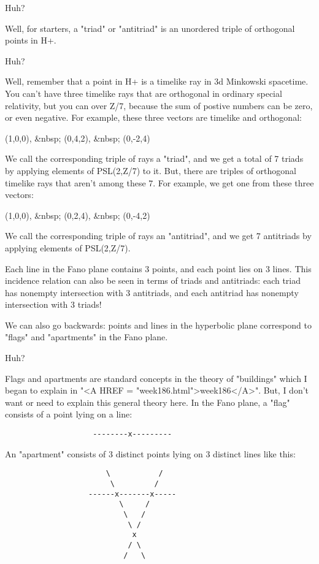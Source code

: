 Huh?  

Well, for starters, a "triad" or "antitriad" is an unordered triple of orthogonal 
points in H+.   

Huh?  

Well, remember that a point in H+ is a timelike ray in 3d Minkowski spacetime.
You can't have three timelike rays that are orthogonal in ordinary special 
relativity, but you can over Z/7, because the sum of postive numbers can be zero, 
or even negative.  For example, these three vectors are timelike and orthogonal:

(1,0,0), &nbsp; (0,4,2),  &nbsp; (0,-2,4)

We call the corresponding triple of rays a 
"triad", and we get a total of 7 triads 
by applying elements of PSL(2,Z/7) to it.  But, there are triples of orthogonal 
timelike rays that aren't among these 7.  For example, we get one from these three 
vectors:

(1,0,0),  &nbsp; (0,2,4), &nbsp; (0,-4,2)

We call the corresponding triple of rays an "antitriad", 
and we get 7  
antitriads by applying elements of PSL(2,Z/7).

Each line in the Fano plane contains 3 points, and each point lies on 3
lines.  This incidence relation can also be seen in terms of triads and
antitriads: each triad has nonempty intersection with 3 antitriads, and
each antitriad has nonempty intersection with 3 triads!

We can also go backwards: points and lines in the hyperbolic plane correspond
to "flags" and "apartments" in the Fano plane.  

Huh?

Flags and apartments are standard concepts in the 
theory of "buildings"
which I began to explain in "<A HREF = "week186.html">week186</A>".  
But, I don't want or need to explain
this general theory here.  In the Fano plane, a "flag" 
consists of a point
lying on a line:
\begin{verbatim}
                    --------x---------
\end{verbatim}
    
An "apartment" 
consists of 3 distinct points lying on 3 distinct lines like
this:
\begin{verbatim}
                       \           /
                        \         /
                   ------x-------x-----
                          \     /
                           \   /
                            \ /
                             x
                            / \
                           /   \
\end{verbatim}
    
